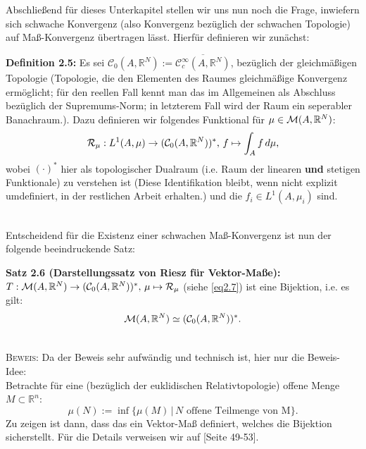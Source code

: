 Abschließend für dieses Unterkapitel stellen wir uns nun noch die Frage, inwiefern sich schwache Konvergenz (also Konvergenz bezüglich der schwachen Topologie) auf Maß-Konvergenz übertragen lässt. Hierfür definieren wir zunächst:\\[0.5cm]
\colorbox{generalYellow}{\begin{minipage}{16cm}{\textcolor{black}{}{\label{def2.5}}}
\textbf{Definition 2.5:} Es sei \(\mathcal{C}_0(A,\mathbb{R}^N) := \overline{\mathcal{C}^{\infty}_c(A,\mathbb{R}^N)}\), bezüglich der gleichmäßigen Topologie (Topologie, die den Elementen des Raumes gleichmäßige Konvergenz ermöglicht; für den reellen Fall kennt man das im Allgemeinen als Abschluss bezüglich der Supremums-Norm; in letzterem Fall wird der Raum ein seperabler Banachraum.). Dazu definieren wir folgendes Funktional für \(\mu \in \mathcal{M}(A,\mathbb{R}^N)\):
\begin{equation}{\label{eq2.7}}
    \mathcal{R}_{\mu}: L^1(A,\mu) \to (\mathcal{C}_0(A,\mathbb{R}^N))^*, \, f \mapsto \int_{A} f \, d\mu,
\end{equation}
wobei \((\cdot)^*\) hier als topologischer Dualraum (i.e. Raum der linearen \textbf{und} stetigen Funktionale) zu verstehen ist (Diese Identifikation bleibt, wenn nicht explizit umdefiniert, in der restlichen Arbeit erhalten.) und die \(f_i \in L^1(A,\mu_i)\) sind.
\end{minipage}}\\

Entscheidend für die Existenz einer schwachen Maß-Konvergenz ist nun der folgende beeindruckende Satz:\\[0.5cm]
\colorbox{generalYellow}{\begin{minipage}{16cm}{\textcolor{black}{}{\label{theo2.6}}}
\textbf{Satz 2.6 (Darstellungssatz von Riesz für Vektor-Maße):} \(T: \mathcal{M}(A,\mathbb{R}^N) \to (\mathcal{C}_0(A,\mathbb{R}^N))^*, \, \mu \mapsto \mathcal{R}_{\mu}\) (siehe \eqref{eq2.7}) ist eine Bijektion, i.e. es gilt:
\begin{equation}
    \mathcal{M}(A,\mathbb{R}^N) \simeq (\mathcal{C}_0(A,\mathbb{R}^N))^*.
\end{equation}
\end{minipage}}\\

\textsc{Beweis:} Da der Beweis sehr aufwändig und technisch ist, hier nur die Beweis-Idee:\\
Betrachte für eine (bezüglich der euklidischen Relativtopologie) offene Menge \(M \subset \mathbb{R}^n\):
\begin{equation}
    \mu(N) := \inf\{\mu(M) \, | \, N \text{ offene Teilmenge von M}\}.
\end{equation}
Zu zeigen ist dann, dass das ein Vektor-Maß definiert, welches die Bijektion sicherstellt. Für die Details verweisen wir auf \cite{EvansMeaTh}[Seite 49-53].\QEDB

